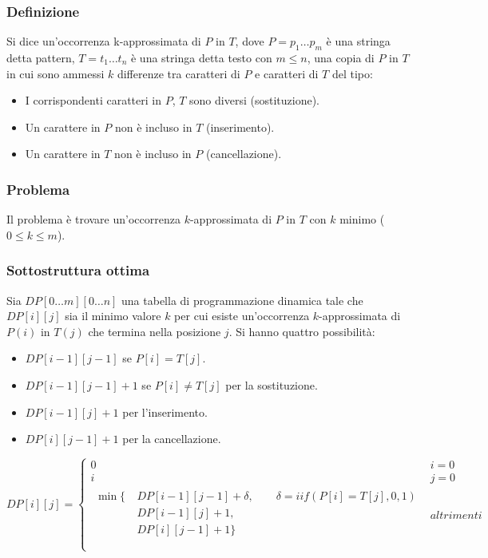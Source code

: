 \subsubsection{Definizione}
Si dice un'occorrenza k-approssimata di $P$ in $T$, dove $P=p_1\dots p_m$ \`e una stringa detta pattern, $T=t_1\dots t_n$ \`e una stringa detta testo con $m\le n$, una copia di $P$ in 
$T$ in cui sono ammessi $k$ differenze tra caratteri di $P$ e caratteri di $T$ del tipo:
\begin{itemize}
	\item I corrispondenti caratteri in $P$, $T$ sono diversi (sostituzione).
	\item Un carattere in $P$ non \`e incluso in $T$ (inserimento).
	\item Un carattere in $T$ non \`e incluso in $P$ (cancellazione).
\end{itemize}
\subsubsection{Problema}
Il problema \`e trovare un'occorrenza $k$-approssimata di $P$ in $T$ con $k$ minimo ($0\le k \le m$).
\subsubsection{Sottostruttura ottima}
Sia $DP[0\dots m][0\dots n]$ una tabella di programmazione dinamica tale che $DP[i][j]$ sia il minimo valore $k$ per cui esiste un'occorrenza $k$-approssimata di $P(i)$ in $T(j)$ che
termina nella posizione $j$. Si hanno quattro possibilit\`a:
\begin{itemize}
	\item $DP[i-1][j-1]$ se $P[i]=T[j]$.
	\item $DP[i-1][j-1]+1$ se $P[i]\neq T[j]$ per la sostituzione.
	\item $DP[i-1][j]+1$ per l'inserimento.
	\item $DP[i][j-1]+1$ per la cancellazione.
\end{itemize}
$$DP[i][j] =
\begin{cases}
	0 & i = 0\\
	i & j = 0\\
\begin{split}
	\min\{\	& DP[i-1][j-1]+\delta, \quad\quad \delta = iif(P[i]=T[j], 0, 1)\\
		& DP[i-1][j]+1, \\
		& DP[i][j-1]+1\} \\
\end{split}& altrimenti\\
\end{cases}$$
